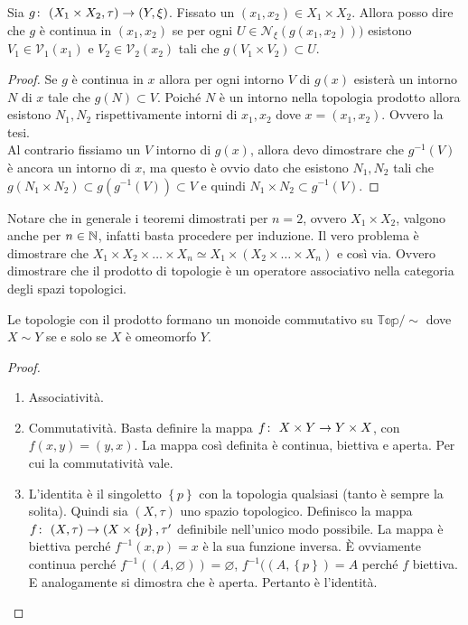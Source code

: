 \begin{theorem}
	Sia $g \colon\ (X_1 \times X_2, \tau) \rightarrow (Y, \xi)$. Fissato un $(x_1, x_2) \in X_1 \times X_2$. Allora posso dire che $g$ è continua in $(x_1, x_2)$ se per ogni $U \in \mathcal{N}_\xi(g(x_1,x_2)))$ esistono $V_1 \in \mathcal{V}_1(x_1)$ e $V_2 \in \mathcal{V}_2(x_2)$ tali che $g(V_1 \times V_2) \subset U$.
\end{theorem}
\begin{proof}
	Se $g$ è continua in $x$ allora per ogni intorno $V$ di $g(x)$ esisterà un intorno $N$ di $x$ tale che $g(N) \subset V$. Poiché $N$ è un intorno nella topologia prodotto allora esistono $N_1, N_2$ rispettivamente intorni di $x_1, x_2$ dove $x = (x_1, x_2)$. Ovvero la tesi.\\
	Al contrario fissiamo un $V$ intorno di $g(x)$, allora devo dimostrare che $g^{-1}(V)$ è ancora un intorno di $x$, ma questo è ovvio dato che esistono $N_1, N_2$ tali che $g(N_1 \times N_2) \subset g(g^{-1}(V)) \subset V$ e quindi $N_1 \times N_2 \subset g^{-1}(V)$. 
\end{proof}

Notare che in generale i teoremi dimostrati per $n=2$, ovvero $X_1 \times X_2$, valgono anche per $n \in \mathbb{N}$, infatti basta procedere per induzione. Il vero problema è dimostrare che $X_1 \times X_2 \times \dots \times X_n \simeq X_1 \times (X_2 \times \dots \times X_n)$ e così via. Ovvero dimostrare che il prodotto di topologie è un operatore associativo nella categoria degli spazi topologici. 

\begin{theorem}
	Le topologie con il prodotto formano un monoide commutativo su $\mathbb{Top}/\sim$ dove $X\sim Y$ se e solo se $X$ è omeomorfo $Y$.
\end{theorem}
\begin{proof}
	\begin{enumerate}
		\item Associatività. 
		\item Commutatività. Basta definire la mappa $f \colon\ X\times Y \rightarrow Y \times X$, con $f(x,y) = (y,x)$. La mappa così definita è continua, biettiva e aperta. Per cui la commutatività vale.
		\item L'identita è il singoletto $\left\{p\right\}$ con la topologia qualsiasi (tanto è sempre la solita). Quindi sia $(X, \tau)$ uno spazio topologico. Definisco la mappa $f \colon\ (X, \tau) \rightarrow (X\times \left\{p\right\}, \tau'$ definibile nell'unico modo possibile. La mappa è biettiva perché $f^{-1}(x, p) = x$ è la sua funzione inversa. È ovviamente continua perché $f^{-1}((A, \varnothing)) = \varnothing$, $f^{-1}((A, \left\{p\right\})= A$ perché $f$ biettiva. E analogamente si dimostra che è aperta. Pertanto è l'identità. 
	\end{enumerate}
\end{proof}

